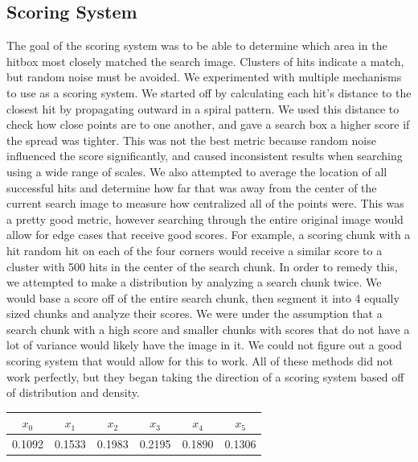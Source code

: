 \documentclass[10pt, journal]{vgtc}                %
\begin{document}
\subsection{Scoring System}
\begin{flushleft}
The goal of the scoring system was to be able to determine which area in the hitbox most closely matched the search image. Clusters of hits indicate a match, but random noise must be avoided. We experimented with multiple mechanisms to use as a scoring system. We started off by calculating each hit’s distance to the closest hit by propagating outward in a spiral pattern. We used this distance to check how close points are to one another, and gave a search box a higher score if the spread was tighter. This was not the best metric because random noise influenced the score significantly, and caused inconsistent results when searching using a wide range of scales. We also attempted to average the location of all successful hits and determine how far that was away from the center of the current search image to measure how centralized all of the points were. This was a pretty good metric, however searching through the entire original image would allow for edge cases that receive good scores. For example, a scoring chunk with a hit random hit on each of the four corners would receive a similar score to a cluster with 500 hits in the center of the search chunk. In order to remedy this, we attempted to make a distribution by analyzing a search chunk twice. We would base a score off of the entire search chunk, then segment it into 4 equally sized chunks and analyze their scores. We were under the assumption that a search chunk with a high score and smaller chunks with scores that do not have a lot of variance would likely have the image in it. We could not figure out a good scoring system that would allow for this to work. All of these methods did not work perfectly, but they began taking the direction of a scoring system based off of distribution and density. \\\smallskip
\begin{table}[h!]
	\label{vis_accept}
	\scriptsize
	\begin{center}
		\begin{tabular}{cccccc}
			$x_0$ & $x_1$ & $x_2$ & $x_3$ & $x_4$  & $x_5$\\
			\hline
			0.1092 &  0.1533 & 0.1983 & 0.2195 & 0.1890 & 0.1306 \\
		\end{tabular}

\end{center}
\end{table}
\end{flushleft}
\end{document}
